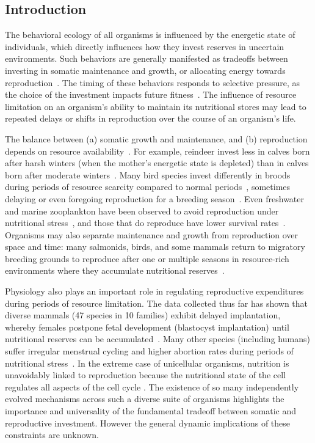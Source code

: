 \documentclass[twocolumn,preprintnumbers,amsmath,amssymb,superscriptaddress]{revtex4}
\begin{document}
\begin{bibunit}[unsrt]

\section*{Introduction}
The behavioral ecology of all organisms is influenced by the energetic state of individuals, which directly influences how they invest reserves in uncertain environments.
Such behaviors are generally manifested as tradeoffs between investing in somatic maintenance and growth, or allocating energy towards reproduction~\cite{Martin:1987dl,Kirk:1997cc,Kempes:2012hy}.
The timing of these behaviors responds to selective pressure, as the choice of the investment impacts future fitness~\cite{Mangel:1988uaa,Mangel:2014kz,Yeakel:2013hi}.
The influence of resource limitation on an organism's ability to maintain its nutritional stores may lead to repeated delays or shifts in reproduction over the course of an organism's life.

The balance between (a) somatic growth and maintenance, and (b) reproduction depends on resource availability~\cite{Morris:1987eo}.
For example, reindeer invest less in calves born after harsh winters (when the mother's energetic state is depleted) than in calves born after moderate winters~\cite{Tveraa:2003fq}.
Many bird species invest differently in broods during periods of resource scarcity compared to normal periods~\cite{Daan:1988va,Jacot:2009dv}, sometimes delaying or even foregoing reproduction for a breeding season~\cite{Martin:1987dl,Stearns:1989ip,Barboza:2002in}.
Even freshwater and marine zooplankton have been observed to avoid reproduction under nutritional stress~\cite{Threlkeld:1976ih}, and those that do reproduce have lower survival rates~\cite{Kirk:1997cc}.
Organisms may also separate maintenance and growth from reproduction over space and time: many salmonids, birds, and some mammals return to migratory breeding grounds to reproduce after one or multiple seasons in resource-rich environments where they accumulate nutritional reserves~\cite{Weber:1998jg,Mduma:1999cp,Moore:2014hi}.

Physiology also plays an important role in regulating reproductive expenditures during periods of resource limitation.
The data collected thus far has shown that diverse mammals (47 species in 10 families) exhibit delayed implantation, whereby females postpone fetal development (blastocyst implantation) until nutritional reserves can be accumulated~\cite{Mead:1989dt,Sandell:1990kw}.
Many other species (including humans) suffer irregular menstrual cycling and higher abortion rates during periods of nutritional stress~\cite{Bulik:1999eo,Trites:2003cc}.
In the extreme case of unicellular organisms, nutrition is unavoidably linked to reproduction because the nutritional state of the cell regulates all aspects of the cell cycle \cite{Glazier:2009hq}.
The existence of so many independently evolved mechanisms across such a diverse suite of organisms highlights the importance and universality of the fundamental tradeoff between somatic and reproductive investment.
However the general dynamic implications of these constraints are unknown.


\end{bibunit}
\end{document}
